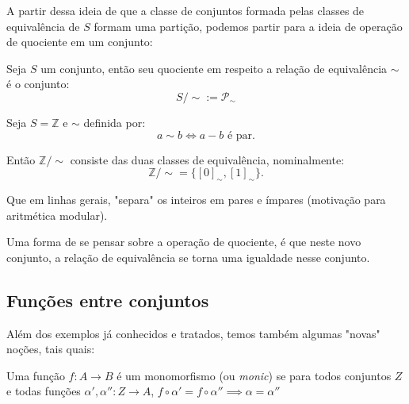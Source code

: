 \documentclass[../main]{subfiles}
\begin{document}
A partir dessa ideia de que a classe de conjuntos formada pelas classes de
equivalência de \(S\) formam uma partição, podemos partir para a ideia de
operação de quociente em um conjunto:

\begin{definition}[Quociente]
    Seja \(S\) um conjunto, então seu quociente em respeito a relação de
    equivalência \(\sim \) é o conjunto:
    \[S/\sim := \mathcal P_\sim \]
\end{definition}
\begin{example}
    Seja \(S = \mathbb Z\) e \(\sim \) definida por:
    \[a \sim b \iff a - b \text{ é par.}\]

    Então \(\mathbb Z/\sim \) consiste das duas classes de equivalência,
    nominalmente:
    \[\mathbb Z/\sim = \{[0]_\sim, [1]_\sim\}.\]

    Que em linhas gerais, "separa" os inteiros em pares e ímpares (motivação
    para aritmética modular).
\end{example}

    Uma forma de se pensar sobre a operação de quociente, é que neste novo
    conjunto, a relação de equivalência se torna uma igualdade nesse conjunto.

\subsection{Funções entre conjuntos}

Além dos exemplos já conhecidos e tratados, temos também algumas "novas" noções,
tais quais:

\begin{definition}[Monomorfismo]
    Uma função \(f : A \to B\) é um monomorfismo (ou \textit{monic}) se para
    todos conjuntos \(Z\) e todas funções \(\alpha', \alpha'': Z \to A\), \(f
    \circ \alpha' = f \circ \alpha'' \implies \alpha = \alpha''\) 
\end{definition}
\end{document}
